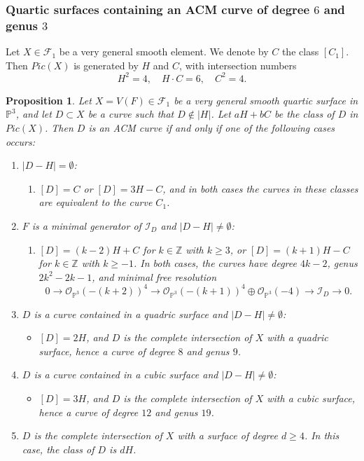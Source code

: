 \documentclass[12pt,reqno]{amsart}
\theoremstyle{plain}
\newtheorem{prop}[theorem]{Proposition}
\theoremstyle{definition}
\theoremstyle{remark}
\theoremstyle{definition}
\newcommand{\PP}{\mathds{P}}
\newcommand{\PPP}{\PP^{3}}
\newcommand{\ii}{\mathscr{I}}
\newcommand{\oo}{\mathcal{O}}
\begin{document}
\subsubsection{\textbf{Quartic surfaces containing an ACM curve of degree $6$ and genus $3$}}
Let $X \in \mathcal{F}_{1}$ be a very general smooth element. We denote by $C$ the class $[C_{1}]$. Then $Pic(X)$ is generated by $H$ and $C$, with intersection numbers
\[
H^{2} = 4, \quad H \cdot C = 6, \quad C^{2} = 4.
\]

\begin{prop}
Let $X = V(F) \in \mathcal{F}_{1}$ be a very general smooth quartic surface in $\PPP$, and let $D \subset X$ be a curve such that $D \notin |H|$. Let $aH + bC$ be the class of $D$ in $Pic(X)$. Then $D$ is an ACM curve if and only if one of the following cases occurs:
\begin{enumerate}[label=(\roman*)]
    \item $|D-H| = \emptyset$:
    \begin{enumerate}
        \item[(a)] $[D] = C$ or $[D] = 3H - C$, and in both cases the curves in these classes are equivalent to the curve $C_{1}$.
    \end{enumerate}

    \item $F$ is a minimal generator of $\ii_{D}$ and $|D-H| \neq \emptyset$:
    \begin{enumerate}
        \item $[D] = (k-2)H + C$ for $k \in \mathds{Z}$ with $k \geq 3$, or $[D] = (k+1)H - C$ for $k \in \mathds{Z}$ with $k \geq -1$. In both cases, the curves have degree $4k-2$, genus $2k^{2}-2k-1$, and minimal free resolution
        \[
        0 \to \oo_{\PPP}(-(k+2))^{4} \to \oo_{\PPP}(-(k+1))^{4} \oplus \oo_{\PPP}(-4) \to \ii_{D} \to 0.
        \]
    \end{enumerate}

    \item $D$ is a curve contained in a quadric surface and $|D-H| \neq \emptyset$:
    \begin{itemize}
        \item[(a)] $[D] = 2H$, and $D$ is the complete intersection of $X$ with a quadric surface, hence a curve of degree $8$ and genus $9$.
    \end{itemize}

    \item $D$ is a curve contained in a cubic surface and $|D-H| \neq \emptyset$:
    \begin{itemize}
        \item[(a)] $[D] = 3H$, and $D$ is the complete intersection of $X$ with a cubic surface, hence a curve of degree $12$ and genus $19$.
    \end{itemize}

    \item $D$ is the complete intersection of $X$ with a surface of degree $d \geq 4$. In this case, the class of $D$ is $dH$.
\end{enumerate}
\end{prop}
\end{document}
